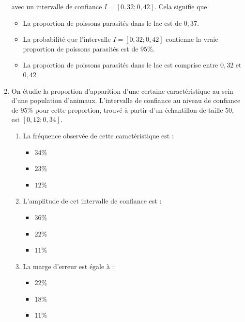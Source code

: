 \documentclass[11pt]{article}
\begin{document}
\begin{enumerate}
  avec un intervalle de confiance $I=\left[ 0,32 ; 0,42 \right]$. Cela
  signifie que
  \begin{itemize}[label=$\Box$]
    \item La proportion de poissons parasités dans le lac est de $0,37$.
    \item La probabilité que l'intervalle $I=\left[ 0,32 ; 0,42 \right]$
      contienne la vraie proportion de poissons parasités est de $95$\%.
    \item La proportion de poissons parasités dans le lac est comprise entre
      $0,32$ et $0,42$.
  \end{itemize}
\item On étudie la proportion d'apparition d'une certaine caractéristique au
  sein d'une population d'animaux. L'intervalle de confiance au niveau de
  confiance de $95$\% pour cette proportion, trouvé à partir d'un échantillon de
  taille $50$, est $\left[ 0,12 ; 0,34 \right]$.
  \begin{enumerate}
    \item La fréquence observée de cette caractéristique est :
      \begin{multicols}{3}
        \begin{itemize}[label=$\Box$]
          \item $34$\%
          \item $23$\%
          \item $12$\%
        \end{itemize}
      \end{multicols}
    \item L'amplitude de cet intervalle de confiance est :
      \begin{multicols}{3}
        \begin{itemize}[label=$\Box$]
          \item $36$\%
          \item $22$\%
          \item $11$\%
        \end{itemize}
      \end{multicols}
    \item La marge d'erreur est égale à :
      \begin{multicols}{3}
        \begin{itemize}[label=$\Box$]
          \item $22$\%
          \item $18$\%
          \item $11$\%
        \end{itemize}

\end{multicols}
\end{enumerate}
\end{enumerate}
\end{document}

